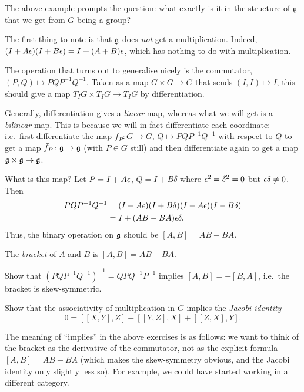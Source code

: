 The above example prompts the question: what exactly is it in the structure of
$\mathfrak{g}$ that we get from $G$ being a group?

The first thing to note is that $\mathfrak{g}$ does \emph{not} get a multiplication.
Indeed, $(I + A\epsilon)(I + B\epsilon) = I + (A + B)\epsilon$, which has nothing to do
with multiplication.

The operation that turns out to generalise nicely is the commutator,
$(P, Q) \mapsto PQP^{-1}Q^{-1}$. Taken as a map $G \times G \to G$ that sends
$(I, I) \mapsto I$, this should give a map $T_IG \times T_IG \to T_IG$ by
differentiation.

\begin{remark}
Generally, differentiation gives a \emph{linear} map, whereas what we will get
is a \emph{bilinear} map. This is because we will in fact differentiate each
coordinate: i.e.\ first differentiate the map $f_P\colon G \to G$,
$Q \mapsto PQP^{-1}Q^{-1}$ with respect to $Q$ to get a map
$\tilde f_P\colon \mathfrak{g} \to \mathfrak{g}$ (with $P \in G$ still) and then differentiate
again to get a map $\mathfrak{g} \times \mathfrak{g} \to \mathfrak{g}$.
\end{remark}

What is this map? Let $P = I + A\epsilon$, $Q = I + B\delta$ where
$\epsilon^2 = \delta^2 = 0$ but $\epsilon\delta \neq 0$. Then
\begin{align*}
  PQP^{-1}Q^{-1} &= (I + A\epsilon)(I + B\delta)(I - A\epsilon)(I - B\delta)\\
                 &= I + (AB - BA)\epsilon\delta.
\end{align*}
Thus, the binary operation on $\mathfrak{g}$ should be $[A, B] = AB - BA$.

\begin{definition}
The \emph{bracket} of $A$ and $B$ is $[A, B] = AB - BA$.
\end{definition}

\begin{exercise}
Show that $(PQP^{-1}Q^{-1})^{-1} = QPQ^{-1}P^{-1}$ implies $[A, B] = -[B, A]$,
i.e.\ the bracket is skew-symmetric.
\end{exercise}

\begin{exercise}
Show that the associativity of multiplication in $G$ implies the \emph{Jacobi
identity}
\[
  0 = [[X, Y], Z] + [[Y, Z], X] + [[Z, X], Y].
\]
\end{exercise}

\begin{remark}
The meaning of ``implies'' in the above exercises is as follows: we want to
think of the bracket as the derivative of the commutator, not as the explicit
formula $[A, B] = AB - BA$ (which makes the skew-symmetry obvious, and the
Jacobi identity only slightly less so). For example, we could have started
working in a different category.
\end{remark}

